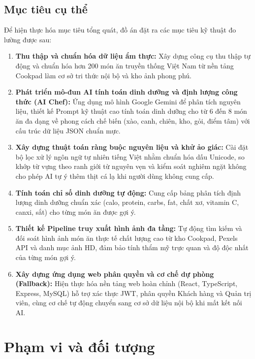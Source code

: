 \subsection{Mục tiêu cụ thể}
Để hiện thực hóa mục tiêu tổng quát, đồ án đặt ra các mục tiêu kỹ thuật đo lường được sau:
\begin{enumerate}[leftmargin=1.6em, itemsep=2pt]
  \item \textbf{Thu thập và chuẩn hóa dữ liệu ẩm thực:} Xây dựng công cụ thu thập tự động  và chuẩn hóa hơn 200 món ăn truyền thống Việt Nam từ nền tảng Cookpad làm cơ sở tri thức nội bộ và kho ảnh phong phú.
  \item \textbf{Phát triển mô-đun AI tính toán dinh dưỡng và định lượng công thức (AI Chef):} Ứng dụng mô hình Google Gemini để phân tích nguyên liệu, thiết kế Prompt kỹ thuật cao tính toán dinh dưỡng cho từ 6 đến 8 món ăn đa dạng về phong cách chế biến (xào, canh, chiên, kho, gỏi, điểm tâm) với cấu trúc dữ liệu JSON chuẩn mực.
  \item \textbf{Xây dựng thuật toán ràng buộc nguyên liệu và khử ảo giác:} Cài đặt bộ lọc xử lý ngôn ngữ tự nhiên tiếng Việt  nhằm chuẩn hóa dấu Unicode, so khớp từ vựng theo ranh giới từ nguyên vẹn và kiểm soát nghiêm ngặt không cho phép AI tự ý thêm thịt cá lạ khi người dùng không cung cấp.
  \item \textbf{Tính toán chỉ số dinh dưỡng tự động:} Cung cấp bảng phân tích định lượng dinh dưỡng chuẩn xác (calo, protein, carbs, fat, chất xơ, vitamin C, canxi, sắt) cho từng món ăn được gợi ý.
  \item \textbf{Thiết kế Pipeline truy xuất hình ảnh đa tầng:} Tự động tìm kiếm và đối soát hình ảnh món ăn thực tế chất lượng cao từ kho Cookpad, Pexels API và danh mục ảnh HD, đảm bảo tính thẩm mỹ trực quan và độ độc nhất của từng món gợi ý.
  \item \textbf{Xây dựng ứng dụng web phân quyền và cơ chế dự phòng (Fallback):} Hiện thực hóa nền tảng web hoàn chỉnh (React, TypeScript, Express, MySQL) hỗ trợ xác thực JWT, phân quyền Khách hàng và Quản trị viên, cùng cơ chế tự động chuyển sang cơ sở dữ liệu nội bộ khi mất kết nối AI.
\end{enumerate}

\section{Phạm vi và đối tượng}

